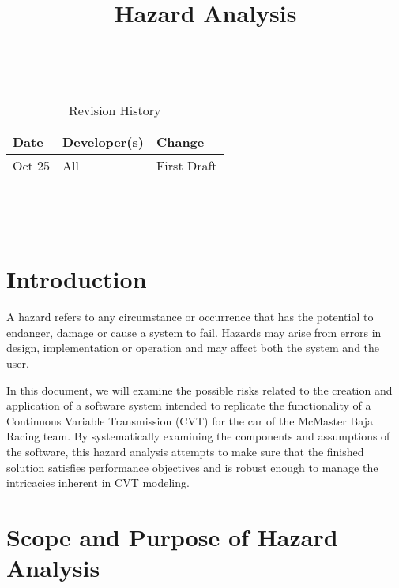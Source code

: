 \documentclass{article}
\title{Hazard Analysis\\\progname}
\author{\authname}
\date{}
\begin{document}
\maketitle
\thispagestyle{empty}

~\newpage


\begin{table}[hp]
\caption{Revision History} \label{TblRevisionHistory}
\begin{tabularx}{\textwidth}{llX}
\toprule
\textbf{Date} & \textbf{Developer(s)} & \textbf{Change}\\
\midrule
Oct 25 & All & First Draft\\
\bottomrule
\end{tabularx}
\end{table}

~\newpage

\tableofcontents

~\newpage


\section{Introduction}

A hazard refers to any circumstance or occurrence that has the potential to endanger, damage or cause a system to fail. Hazards may arise from errors in design, implementation or operation and may affect both the system and the user.

\noindent In this document, we will examine the possible risks related to the creation and application of a software system intended to replicate the functionality of a Continuous Variable Transmission (CVT) for the car of the McMaster Baja Racing team. By systematically examining the components and assumptions of the software, this hazard analysis attempts to make sure that the finished solution satisfies performance objectives and is robust enough to manage the intricacies inherent in CVT modeling.

\section{Scope and Purpose of Hazard Analysis}
\end{document}
